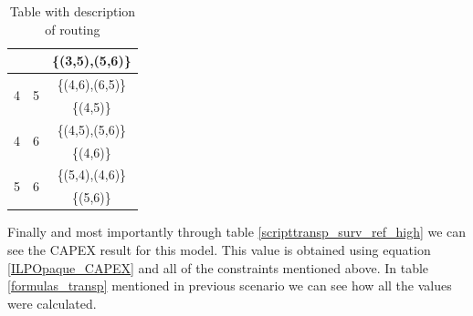 \begin{table}[h!]
\begin{tabular}{|| c | c | c ||}
 & & \{(3,5),(5,6)\} \\ \hline
 \multirow{2}{*}{4} & \multirow{2}{*}{5} & \{(4,6),(6,5)\} \\
 & & \{(4,5)\} \\ \hline
 \multirow{2}{*}{4} & \multirow{2}{*}{6} & \{(4,5),(5,6)\} \\
 & & \{(4,6)\} \\ \hline
 \multirow{2}{*}{5} & \multirow{2}{*}{6} & \{(5,4),(4,6)\} \\
 & & \{(5,6)\} \\
 \hline
\end{tabular}
\caption{Table with description of routing}
\label{path_transp_protec_ref_high}
\end{table}

Finally and most importantly through table \ref{scripttransp_surv_ref_high} we can see the CAPEX result for this model. This value is obtained using equation \ref{ILPOpaque_CAPEX} and all of the constraints mentioned above. In table \ref{formulas_transp} mentioned in previous scenario we can see how all the values were calculated.\\
\newpage
